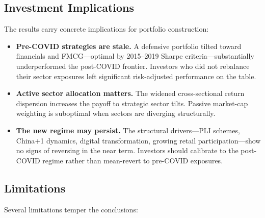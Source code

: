\documentclass[12pt,a4paper]{article}
\begin{document}
\subsection{Investment Implications}

The results carry concrete implications for portfolio construction:

\begin{itemize}
    \item \textbf{Pre-COVID strategies are stale.} A defensive portfolio tilted toward
        financials and FMCG---optimal by 2015--2019 Sharpe criteria---substantially
        underperformed the post-COVID frontier. Investors who did not rebalance their
        sector exposures left significant risk-adjusted performance on the table.
    \item \textbf{Active sector allocation matters.} The widened cross-sectional return
        dispersion increases the payoff to strategic sector tilts. Passive market-cap
        weighting is suboptimal when sectors are diverging structurally.
    \item \textbf{The new regime may persist.} The structural drivers---PLI schemes,
        China$+$1 dynamics, digital transformation, growing retail participation---show
        no signs of reversing in the near term. Investors should calibrate to the
        post-COVID regime rather than mean-revert to pre-COVID exposures.
\end{itemize}

\subsection{Limitations}

Several limitations temper the conclusions:
\end{document}

